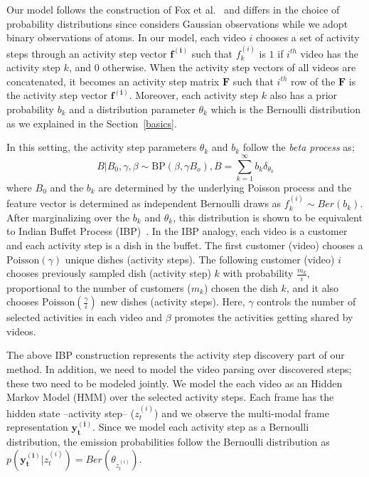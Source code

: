 Our model follows the construction of Fox et al.~\cite{foxBPHMM} and differs in the choice of probability distributions since \cite{foxBPHMM} considers Gaussian observations while we adopt binary observations of atoms. In our model, each video $i$ chooses a set of activity steps through an activity step vector $\mathbf{f^{(i)}}$ such that $f^{(i)}_k$ is $1$ if $i^{th}$ video has the activity step $k$, and 0 otherwise. When the activity step vectors of all videos are concatenated, it becomes an activity step matrix $\mathbf{F}$ such that $i^{th}$ row of the $\mathbf{F}$ is the activity step vector $\mathbf{f^{(i)}}$. Moreover, each activity step $k$ also has a prior probability $b_k$  and a distribution parameter $\theta_k$ which is the Bernoulli distribution as we explained in the Section~\ref{basics}.

In this setting, the activity step parameters $\theta_k$ and $b_k$ follow the \emph{beta process} as;
\vskip -2mm
\begin{equation}
  B|B_0,\gamma,\beta \sim \text{BP}(\beta,\gamma B_o), B=\sum_{k=1}^\infty b_k \delta_{\theta_k}
\end{equation}
where $B_0$ and the $b_k$ are determined by the underlying Poisson process \cite{ibp} and the feature vector is determined as independent Bernoulli draws as $f_{k}^{(i)} \sim Ber(b_k)$. After marginalizing over the $b_k$ and $\theta_k$, this distribution is shown to be equivalent to Indian Buffet Process (IBP)~\cite{ibp}. In the IBP analogy, each video is a customer and each activity step is a dish in the buffet. The first customer (video) chooses a $\text{Poisson}(\gamma)$ unique dishes (activity steps). The following customer (video) $i$ chooses previously sampled dish (activity step) $k$ with probability $\frac{m_k}{i}$,  proportional to the number of customers ($m_k$) chosen the dish $k$, and it also chooses $\text{Poisson}(\frac{\gamma}{i})$ new dishes (activity steps). Here, $\gamma$ controls the number of selected activities in each video and $\beta$ promotes the activities getting shared by videos.

The above IBP construction represents the activity step discovery part of our method. In addition, we need to model the video parsing over discovered steps; these two need to be modeled jointly. We model the each video as an Hidden Markov Model (HMM) over the selected activity steps. Each frame has the hidden state --activity step-- ($z^{(i)}_t$) and we observe the multi-modal frame representation $\mathbf{y^{(i)}_t}$. Since we model each activity step as a Bernoulli distribution, the emission probabilities follow the Bernoulli distribution as $p(\mathbf{y^{(i)}_t}|z^{(i)}_t)=Ber(\theta_{z^{(i)}_t})$.

